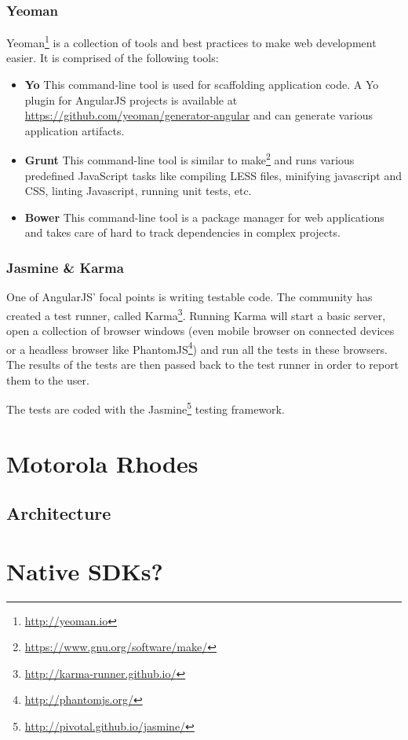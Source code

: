 \subsubsection{Yeoman}

Yeoman\footnote{\url{http://yeoman.io}} is a collection of tools and best practices to make web development easier. It is comprised of the following tools:
\begin{itemize}
    \item \textbf{Yo} This command-line tool is used for scaffolding application code. A Yo plugin for AngularJS projects is available at \url{https://github.com/yeoman/generator-angular} and can generate various application artifacts.
    \item \textbf{Grunt} This command-line tool is similar to make\footnote{\url{https://www.gnu.org/software/make/}} and runs various predefined JavaScript tasks like compiling LESS files, minifying javascript and CSS, linting Javascript, running unit tests, etc.
    \item \textbf{Bower} This command-line tool is a package manager for web applications and takes care of hard to track dependencies in complex projects. 
\end{itemize}

\subsubsection{Jasmine \& Karma}

One of AngularJS' focal points is writing testable code. The community has created a test runner, called Karma\footnote{\url{http://karma-runner.github.io/}}. Running Karma will start a basic server, open a collection of browser windows (even mobile browser on connected devices or a headless browser like PhantomJS\footnote{\url{http://phantomjs.org/}}) and run all the tests in these browsers. The results of the tests are then passed back to the test runner in order to report them to the user. 

The tests are coded with the Jasmine\footnote{\url{http://pivotal.github.io/jasmine/}} testing framework.

\section{Motorola Rhodes}

\subsection{Architecture}



\section{Native SDKs?}